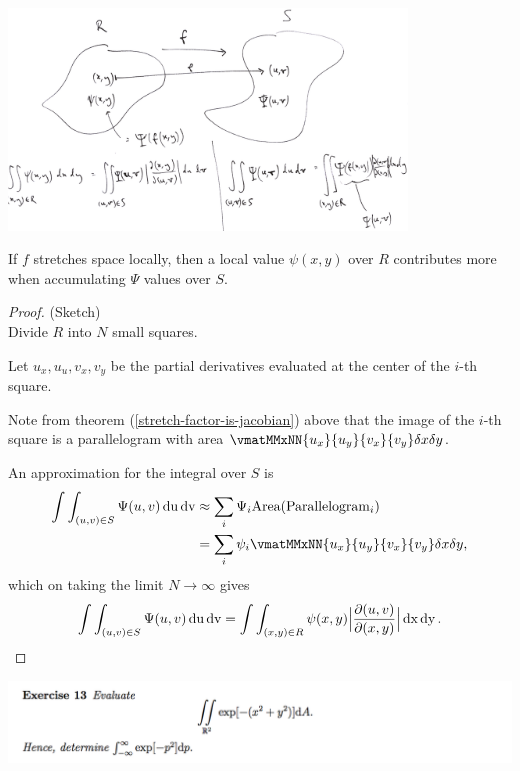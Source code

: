 \begin{mdframed}
\includegraphics[width=300pt]{img/calculus-jacobian-2D-map.png}
\end{mdframed}

\begin{intuition*}
  If $f$ stretches space locally, then a local value $\psi(x,y)$ over $R$ contributes more when
  accumulating $\Psi$ values over $S$.
\end{intuition*}

\begin{proof}(Sketch)\\
  Divide $R$ into $N$ small squares.

  Let $u_x, u_u, v_x, v_y$ be the partial derivatives evaluated at the center of the $i$-th square.

  Note from theorem (\ref{stretch-factor-is-jacobian}) above that the image of the $i$-th square is
  a parallelogram with area $\vmatMMxNN {u_x}{u_y} {v_x}{v_y} \delta x \delta y$.

  An approximation for the integral over $S$ is
  \begin{align*}
    \int\int_{(u,v) \in S} \Psi(u,v)\du \dv
    &\approx \sum_i \Psi_i \text{Area(Parallelogram$_i$)}\\
    &= \sum_i \psi_i \vmatMMxNN
      {u_x}{u_y}
      {v_x}{v_y} \delta x \delta y,
  \end{align*}
  which on taking the limit $N \to \infty$ gives
  \begin{align*}
    \int\int_{(u,v) \in S} \Psi(u,v)\operatorname{\text{du}} \operatorname{\text{dv}} =
    \int\int_{(x,y) \in R} \psi(x,y) \Big|\frac{\partial(u, v)}{\partial(x, y)}\Big| \operatorname{\text{dx}} \operatorname{\text{dy}}.
  \end{align*}
\end{proof}

\newpage
\begin{mdframed}
  \includegraphics[width=400pt]{img/oxford-prelims-M5-multivariable-calc-ex-13.png}
\end{mdframed}

